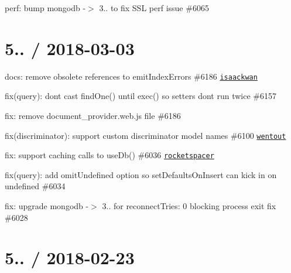 \begin{DoxyItemize}
\item perf\+: bump mongodb -\/$>$ 3.. to fix S\+SL perf issue \#6065
\end{DoxyItemize}

\section*{5.. / 2018-\/03-\/03 }


\begin{DoxyItemize}
\item docs\+: remove obsolete references to {\ttfamily emit\+Index\+Errors} \#6186 \href{https://github.com/isaackwan}{\tt isaackwan}
\item fix(query)\+: don\textquotesingle{}t cast find\+One() until exec() so setters don\textquotesingle{}t run twice \#6157
\item fix\+: remove document\+\_\+provider.\+web.\+js file \#6186
\item fix(discriminator)\+: support custom discriminator model names \#6100 \href{https://github.com/wentout}{\tt wentout}
\item fix\+: support caching calls to {\ttfamily use\+Db()} \#6036 \href{https://github.com/rocketspacer}{\tt rocketspacer}
\item fix(query)\+: add omit\+Undefined option so set\+Defaults\+On\+Insert can kick in on undefined \#6034
\item fix\+: upgrade mongodb -\/$>$ 3.. for reconnect\+Tries\+: 0 blocking process exit fix \#6028
\end{DoxyItemize}

\section*{5.. / 2018-\/02-\/23 }


